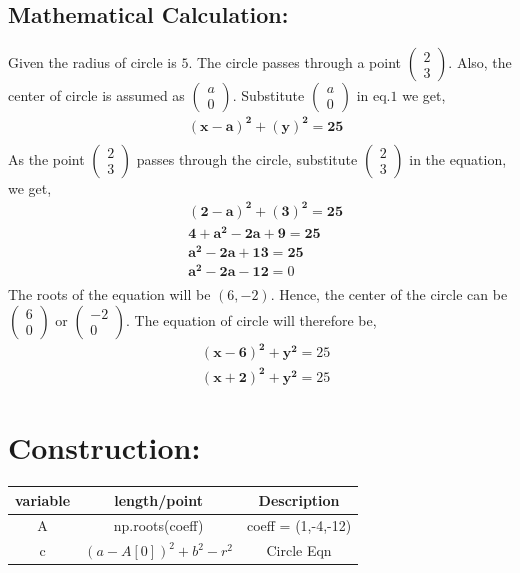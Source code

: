 \documentclass[a4paper,12pt,twocolumn]{article}
\let\vec\mathbf
\newcommand{\myvec}[1]{\ensuremath{\begin{pmatrix}#1\end{pmatrix}}}
\begin{document}
\subsection{Mathematical Calculation:}
Given the radius of circle is $5$. The circle passes through a point $\myvec{2\\3}$. Also, the center of circle is assumed as $\myvec{a\\0}$. Substitute $\myvec{a\\0}$ in eq.$1$ we get,
\begin{align}
	&\vec{(x-a)^2} + \vec{(y)^2} = \vec{25}\\
\end{align}
As the point $\myvec{2\\3}$ passes through the circle, substitute $\myvec{2\\3}$ in the equation, we get,
\begin{align}
	&\vec{(2-a)^2} + \vec{(3)^2} = \vec{25}\\
	&\vec{4+a^2-2a} + \vec{9} = \vec{25}\\
	&\vec{a^2-2a+13} = \vec{25}\\
	&\vec{a^2-2a-12} = 0\\
\end{align}
The roots of the equation will be $(6,-2)$. Hence, the center of the circle can be $\myvec{6\\0}$ or $\myvec{-2\\0}$.
The equation of circle will therefore be,
\begin{align}
	&\vec{(x-6)^2} + \vec{y^2} = 25\\
	&\vec{(x+2)^2} + \vec{y^2} = 25
\end{align}
\section{Construction:}

\begin{table}[h]
        \centering
\setlength\extrarowheight{2pt}
        \begin{tabular}{|c|c|c|}
                \hline
                \textbf{variable} & \textbf{length/point} & \textbf{Description}\\
                \hline
		A & np.roots(coeff) & coeff = (1,-4,-12)\\
		\hline
		c & $(a-A[0])^2+b^2-r^2$ & Circle Eqn\\
		\hline
        \end{tabular}
\end{table}
\end{document}
